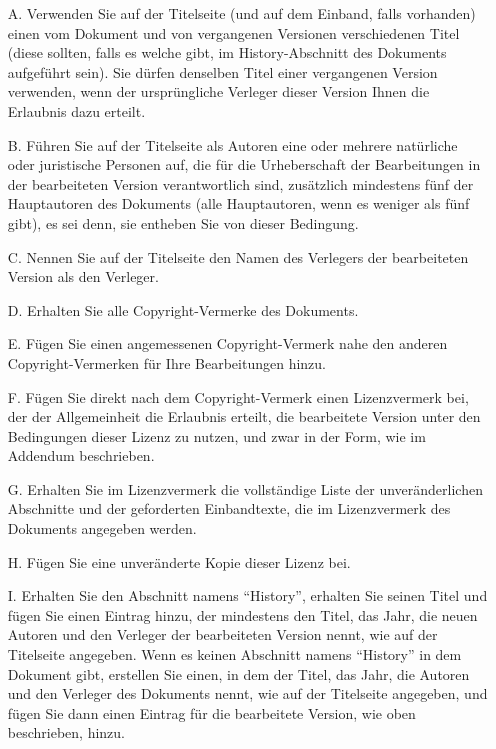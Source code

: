 \begin{itemize}
\item[A.] 
   Verwenden Sie auf der Titelseite (und auf dem Einband, falls vorhanden) einen vom Dokument
   und von vergangenen Versionen verschiedenen Titel (diese sollten, falls es welche gibt,
   im History-Abschnitt des Dokuments aufgeführt sein). Sie dürfen denselben Titel einer vergangenen Version
   verwenden, wenn der ursprüngliche Verleger dieser Version Ihnen die Erlaubnis dazu erteilt.
   
\item[B.]
   Führen Sie auf der Titelseite als Autoren eine oder mehrere natürliche oder juristische Personen auf,
   die für die Urheberschaft der Bearbeitungen in der bearbeiteten Version verantwortlich sind,
   zusätzlich mindestens fünf der Hauptautoren des Dokuments (alle Hauptautoren, wenn es weniger als fünf
   gibt), es sei denn, sie entheben Sie von dieser Bedingung.
   
\item[C.]
   Nennen Sie auf der Titelseite den Namen des Verlegers der bearbeiteten Version
   als den Verleger.
   
\item[D.]
   Erhalten Sie alle Copyright-Vermerke des Dokuments.
   
\item[E.]
   Fügen Sie einen angemessenen Copyright-Vermerk nahe den anderen Copyright-Vermerken
   für Ihre Bearbeitungen hinzu.
   
\item[F.]
   Fügen Sie direkt nach dem Copyright-Vermerk einen Lizenzvermerk bei, 
   der der Allgemeinheit die Erlaubnis erteilt, die bearbeitete Version unter den 
   Bedingungen dieser Lizenz zu nutzen, und zwar in der Form, wie im Addendum beschrieben.
   
\item[G.]
   Erhalten Sie im Lizenzvermerk die vollständige Liste der unveränderlichen
   Abschnitte und der geforderten Einbandtexte, die im Lizenzvermerk des Dokuments angegeben werden.
   
\item[H.]
   Fügen Sie eine unveränderte Kopie dieser Lizenz bei.
   
\item[I.]
   Erhalten Sie den Abschnitt namens "`History"', erhalten Sie seinen Titel und fügen Sie
   einen Eintrag hinzu, der mindestens den Titel, das Jahr, die neuen Autoren und den Verleger
   der bearbeiteten Version nennt, wie auf der Titelseite angegeben. Wenn
   es keinen Abschnitt namens "`History"' in dem Dokument gibt, erstellen Sie einen, in dem
   der Titel, das Jahr, die Autoren und den Verleger des Dokuments nennt, wie auf der Titelseite
   angegeben, und fügen Sie dann einen Eintrag für die bearbeitete Version, wie oben beschrieben, hinzu.
   

\end{itemize}
